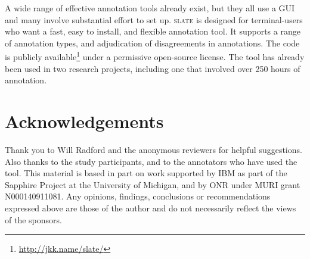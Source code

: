 \documentclass[11pt,a4paper]{article}
\newcommand\slate{\textsc{slate}\xspace}
\begin{document}
A wide range of effective annotation tools already exist, but they all use a GUI and many involve substantial effort to set up.
\slate is designed for terminal-users who want a fast, easy to install, and flexible annotation tool.
It supports a range of annotation types, and adjudication of disagreements in annotations.
The code is publicly available\footnote{\url{http://jkk.name/slate/}} under a permissive open-source license.
The tool has already been used in two research projects, including one that involved over 250 hours of annotation.

\section*{Acknowledgements}

Thank you to Will Radford and the anonymous reviewers for helpful suggestions.
Also thanks to the study participants, and to the annotators who have used the tool.
This material is based in part on work supported by IBM as part of the Sapphire Project at the University of Michigan, and by ONR under MURI grant N000140911081.
Any opinions, findings, conclusions or recommendations expressed above are those of the author and do not necessarily reflect the views of the sponsors.



\end{document}
